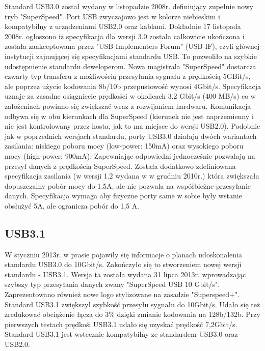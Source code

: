 \documentclass{BscUS}
\begin{document}
Standard USB3.0 został wydany w listopadzie 2008r. definiujący zupełnie nowy tryb "SuperSpeed". Port USB zwyczajowo jest w kolorze niebieskim i kompatybilny z urządzeniami USB2.0 oraz kablami.
\newline
Dokładnie 17 listopada 2008r. ogłoszono iż specyfikacja dla wersji 3.0 została całkowicie ukończona i została zaakceptowana przez "USB Implementers Forum" (USB-IF), czyli głównej instytucji zajmującej się specyfikacjami standardu USB. To pozwoliło na szybkie udostępnienie standardu deweloperom.
\newline
Nowa magistrala "SuperSpeed" dostarcza czwarty typ transferu z możliwością przesyłania sygnału z prędkością 5GBit/s, ale poprzez użycie kodowania 8b/10b przepustowość wynosi 4Gbit/s. Specyfikacja uznaje za zasadne osiągniecie prędkości w okolicach 3,2 Gbit/s (400 MB/s) co w założeniach powinno się zwiększać wraz z rozwijaniem hardwaru. Komunikacja odbywa się w obu kierunkach dla SuperSpeed (kierunek nie jest naprzemienny i nie jest kontrolowany przez hosta, jak to ma miejsce do wersji USB2.0).
\newline
Podobnie jak w poprzednich wersjach standardu, porty USB3.0 działają dwóch wariantach zasilania: niskiego poboru mocy (low-power: 150mA) oraz wysokiego poboru mocy (high-power: 900mA). Zapewniając odpowiedni jednocześnie pozwalają na przesył danych z prędkością SuperSpeed.
\newline
Została dodatkowo zdefiniowana specyfikacja zasilania (w wersji 1.2 wydana w w grudniu 2010r.) która zwiększała dopuszczalny pobór mocy do 1,5A, ale nie pozwala na współbieżne przesyłanie danych. Specyfikacja wymaga aby fizyczne porty same w sobie były wstanie obsłużyć 5A, ale ogranicza pobór do 1,5 A.
\cite{USB30Doc}
\subsection{USB3.1}
W styczniu 2013r. w prasie pojawiły się informacje o planach udoskonalenia standardu USB3.0 do 10Gbit/s. Zakończyło się to stworzeniem nowej wersji standardu - USB3.1. Wersja ta została wydana 31 lipca 2013r. wprowadzając szybszy typ przesyłania danych zwany "SuperSpeed USB 10 Gbit/s". Zaprezentowano również nowe logo stylizowane na zasadzie "Superspeed+". Standard USB3.1 zwiększył szybkość przesyłu sygnału do 10Gbit/s. Udało się też zredukować obciążenie łącza do 3\% dzięki zmianie kodowania na 128b/132b.
\newline
Przy pierwszych testach prędkośi USB3.1 udało się uzyskać prędkość 7,2Gbit/s.
\newline
Standard USB3.1 jest wstecznie kompatybilny ze standardem USB3.0 oraz USB2.0.
\cite{USB30Doc}
\end{document}

